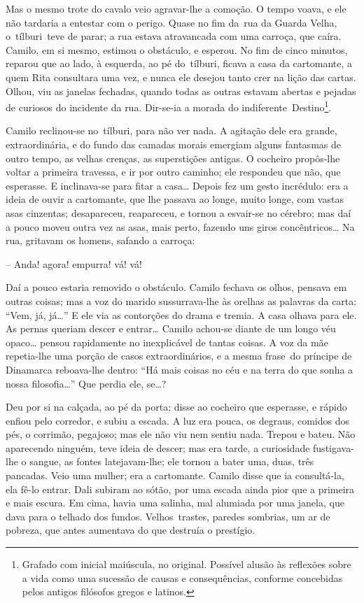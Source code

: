 Mas o mesmo trote do cavalo veio agravar-lhe a comoção. O tempo voava, e
ele não tardaria a entestar com o perigo. Quase no fim da~rua da Guarda
Velha, o~tílburi~teve de parar; a rua estava atravancada com uma
carroça, que caíra. Camilo, em si mesmo, estimou o obstáculo, e esperou.
No fim de cinco minutos, reparou que ao lado, à esquerda, ao pé
do~tílburi, ficava a casa da cartomante, a quem Rita consultara uma vez,
e nunca ele desejou tanto crer na lição das cartas. Olhou, viu as
janelas fechadas, quando todas as outras estavam abertas e pejadas de
curiosos do incidente da rua. Dir-se-ia a morada do
indiferente~Destino\footnote{Grafado com inicial maiúscula, no original.
  Possível alusão às reflexões sobre a vida como uma sucessão de causas
  e consequências, conforme concebidas pelos antigos filósofos gregos e
  latinos.}.

Camilo reclinou-se no~tílburi, para não ver nada. A agitação dele era
grande, extraordinária, e do fundo das camadas morais emergiam alguns
fantasmas de outro tempo, as velhas crenças, as superstições antigas. O
cocheiro propôs-lhe voltar a primeira travessa, e ir por outro caminho;
ele respondeu que não, que esperasse. E inclinava-se para fitar a
casa\ldots{} Depois fez um gesto incrédulo: era a ideia de ouvir a
cartomante, que lhe passava ao longe, muito longe, com vastas asas
cinzentas; desapareceu, reapareceu, e tornou a esvair-se no cérebro; mas
daí a pouco moveu outra vez as asas, mais perto, fazendo uns giros
concêntricos\ldots{} Na rua, gritavam os homens, safando a carroça:

-- Anda! agora! empurra! vá! vá!

Daí a pouco estaria removido o obstáculo. Camilo fechava os olhos,
pensava em outras coisas; mas a voz do marido sussurrava-lhe às orelhas
as palavras da carta: ``Vem, já, já\ldots{}'' E ele via as contorções do
drama e tremia. A casa olhava para ele. As pernas queriam descer e
entrar\ldots{} Camilo achou-se diante de um longo véu opaco\ldots{}
pensou rapidamente no inexplicável de tantas coisas. A voz da mãe
repetia-lhe uma porção de casos extraordinários, e a mesma frase~do
príncipe de Dinamarca reboava-lhe dentro: ``Há mais coisas no céu e na
terra do que sonha a nossa filosofia\ldots{}'' Que perdia ele,
se\ldots{}?

Deu por si na calçada, ao pé da porta; disse ao cocheiro que esperasse,
e rápido enfiou pelo corredor, e subiu a escada. A luz era pouca, os
degraus, comidos dos pés, o corrimão, pegajoso; mas ele não viu nem
sentiu nada. Trepou e bateu. Não aparecendo ninguém, teve ideia de
descer; mas era tarde, a curiosidade fustigava-lhe o sangue, as fontes
latejavam-lhe; ele tornou a bater uma, duas, três pancadas. Veio uma
mulher; era a cartomante. Camilo disse que ia consultá-la, ela fê-lo
entrar. Dali subiram ao sótão, por uma escada ainda pior que a primeira
e mais escura. Em cima, havia uma salinha, mal alumiada por uma janela,
que dava para o telhado dos fundos. Velhos~trastes, paredes sombrias, um
ar de pobreza, que antes aumentava do que destruía o prestígio.

